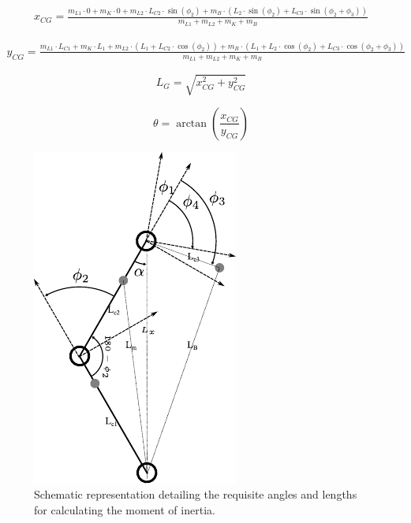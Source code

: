 	\begin{equation}
		\begin{aligned}
			x_{CG} = \frac{m_{L1} \cdot 0 + m_K \cdot 0 + m_{L2} \cdot L_{C2} \cdot \sin(\phi_2) + m_B \cdot (L_2 \cdot \sin(\phi_2) + L_{C3} \cdot \sin(\phi_2 + \phi_3))}{m_{L1} + m_{L2} + m_K + m_B}
		\end{aligned}
	\end{equation}

	\begin{equation}
		\begin{aligned}
			y_{CG} = \frac{m_{L1} \cdot L_{C1} + m_K \cdot L_1 + m_{L2} \cdot (L_1 + L_{C2} \cdot \cos(\phi_2)) + m_B \cdot (L_1 + L_2 \cdot \cos(\phi_2) + L_{C3} \cdot \cos(\phi_2 + \phi_3))}{m_{L1} + m_{L2} + m_K + m_B}
		\end{aligned}
	\end{equation}

	\begin{equation}
		L_G = \sqrt{x_{CG}^2 + y_{CG}^2}
	\end{equation}

	\begin{equation}
		\theta = \arctan\left(\frac{{x_{CG}}}{{y_{CG}}}\right)
	\end{equation}

	\begin{figure}[h]
		\centering
		\includegraphics[width=.5\textwidth]{Angles}
		\caption[Moment of inertia Schematic representation]{Schematic representation detailing the requisite angles and lengths for calculating the moment of inertia.}
		\label{fig:Schematic representation xxxxx detailing the requisite angles and lengths for calculating the moment of inertia.}
	\end{figure}

